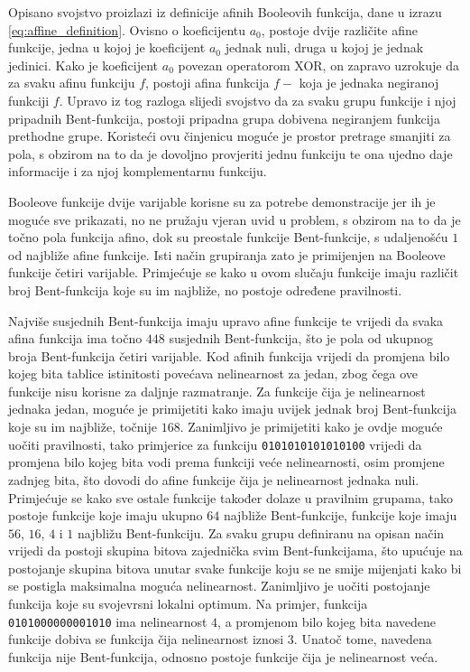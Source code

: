 Opisano svojstvo proizlazi iz definicije afinih Booleovih funkcija, dane u izrazu \eqref{eq:affine_definition}.
Ovisno o koeficijentu $a_0$, postoje dvije različite afine funkcije, jedna u kojoj je koeficijent $a_0$ jednak nuli, druga u kojoj je jednak jedinici.
Kako je koeficijent $a_0$ povezan operatorom XOR, on zapravo uzrokuje da za svaku afinu funkciju $f$, postoji afina funkcija $f-$ koja je jednaka negiranoj funkciji $f$.
Upravo iz tog razloga slijedi svojstvo da za svaku grupu funkcije i njoj pripadnih Bent-funkcija, postoji pripadna grupa dobivena negiranjem funkcija prethodne grupe.
Koristeći ovu činjenicu moguće je prostor pretrage smanjiti za pola, s obzirom na to da je dovoljno provjeriti jednu funkciju te ona ujedno daje informacije i za njoj komplementarnu funkciju.

Booleove funkcije dvije varijable korisne su za potrebe demonstracije jer ih je moguće sve prikazati, no ne pružaju vjeran uvid u problem, s obzirom na to da je točno pola funkcija afino, dok su preostale funkcije Bent-funkcije, s udaljenošću $1$ od najbliže afine funkcije.
Isti način grupiranja zato je primijenjen na Booleove funkcije četiri varijable.
Primjećuje se kako u ovom slučaju funkcije imaju različit broj Bent-funkcija koje su im najbliže, no postoje određene pravilnosti.

Najviše susjednih Bent-funkcija imaju upravo afine funkcije te vrijedi da svaka afina funkcija ima točno $448$ susjednih Bent-funkcija, što je pola od ukupnog broja Bent-funkcija četiri varijable.
Kod afinih funkcija vrijedi da promjena bilo kojeg bita tablice istinitosti povećava nelinearnost za jedan, zbog čega ove funkcije nisu korisne za daljnje razmatranje.
Za funkcije čija je nelinearnost jednaka jedan, moguće je primijetiti kako imaju uvijek jednak broj Bent-funkcija koje su im najbliže, točnije $168$.
Zanimljivo je primijetiti kako je ovdje moguće uočiti pravilnosti, tako primjerice za funkciju \texttt{0101010101010100} vrijedi da promjena bilo kojeg bita vodi prema funkciji veće nelinearnosti, osim promjene zadnjeg bita, što dovodi do afine funkcije čija je nelinearnost jednaka nuli.
Primjećuje se kako sve ostale funkcije također dolaze u pravilnim grupama, tako postoje funkcije koje imaju ukupno $64$ najbliže Bent-funkcije, funkcije koje imaju $56$, $16$, $4$ i $1$ najbližu Bent-funkciju.
Za svaku grupu definiranu na opisan način vrijedi da postoji skupina bitova zajednička svim Bent-funkcijama, što upućuje na postojanje skupina bitova unutar svake funkcije koju se ne smije mijenjati kako bi se postigla maksimalna moguća nelinearnost.
Zanimljivo je uočiti postojanje funkcija koje su svojevrsni lokalni optimum.
Na primjer, funkcija \texttt{0101000000001010} ima nelinearnost $4$, a promjenom bilo kojeg bita navedene funkcije dobiva se funkcija čija nelinearnost iznosi $3$.
Unatoč tome, navedena funkcija nije Bent-funkcija, odnosno postoje funkcije čija je nelinearnost veća.

